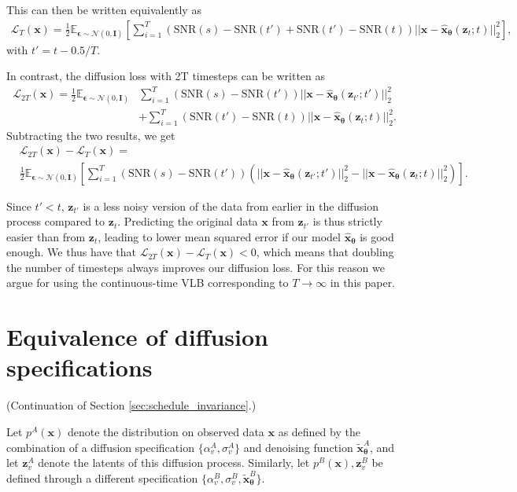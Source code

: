 \documentclass{article}
\def\rvx{{\mathbf{x}}}
\def\rvz{{\mathbf{z}}}
\newcommand{\E}{\mathbb{E}}
\newcommand{\bT}{{\boldsymbol{\theta}}}
\newcommand{\bfI}{\mathbf{I}}
\newcommand{\bepsilon}{{\boldsymbol{\epsilon}}}
\newcommand{\lT}{\mathcal{L}_T(\rvx)}
\newcommand{\ldT}{\mathcal{L}_{2T}(\rvx)}
\newcommand{\snr}{\text{SNR}}
\begin{document}
This can then be written equivalently as
\begin{align}
\lT =
\frac{1}{2}\E_{\bepsilon \sim \mathcal{N}(0,\bfI)}
\left[\sum_{i=1}^T
\left(\snr(s)-\snr(t') + \snr(t')-\snr(t)\right)
||\rvx - \hat{\rvx}_{\bT}(\rvz_{t};t) ||_2^2 \right],
\end{align}
with $t' = t - 0.5/T$.

In contrast, the diffusion loss with 2T timesteps can be written as
\begin{align}
\ldT =
\frac{1}{2}\E_{\bepsilon \sim \mathcal{N}(0,\bfI)}
& \sum_{i=1}^T
\left(\snr(s)-\snr(t')\right)
||\rvx - \hat{\rvx}_{\bT}(\rvz_{t'};t') ||_2^2 \nonumber\\
&+ \sum_{i=1}^T
\left(\snr(t')-\snr(t)\right)
||\rvx - \hat{\rvx}_{\bT}(\rvz_{t};t) ||_2^2.
\end{align}
Subtracting the two results, we get
\begin{align}
&\ldT - \lT = \nonumber\\ &\frac{1}{2}\E_{\bepsilon \sim \mathcal{N}(0,\bfI)}
\left[\sum_{i=1}^T (\snr(s)-\snr(t')) \left(
||\rvx - \hat{\rvx}_{\bT}(\rvz_{t'};t') ||_2^2 - ||\rvx - \hat{\rvx}_{\bT}(\rvz_{t};t) ||_2^2 \right)\right].
\end{align}

Since $t' < t$, $\rvz_{t'}$ is a less noisy version of the data from earlier in the diffusion process compared to $\rvz_{t}$. Predicting the original data $\rvx$ from $\rvz_{t'}$ is thus strictly easier than from $\rvz_{t}$, leading to lower mean squared error if our model $\hat{\mathbf{x}}_{\bT}$ is good enough. We thus have that $\ldT - \lT < 0$, which means that doubling the number of timesteps always improves our diffusion loss. For this reason we argue for using the continuous-time VLB corresponding to $T\rightarrow\infty$ in this paper.

\section{Equivalence of diffusion specifications}
\label{sec:app_equivalence}
(Continuation of Section \ref{sec:schedule_invariance}.)

Let $p^{A}(\rvx)$ denote the distribution on observed data $\rvx$ as defined by the combination of a diffusion specification $\{\alpha^A_v, \sigma^A_v\}$ and denoising function $\tilde{\rvx}^A_{\bT}$, and let $\rvz^{A}_v$ denote the latents of this diffusion process. Similarly, let $p^{B}(\rvx), \rvz^{B}_v$ be defined through a different specification $\{\alpha^B_v, \sigma^B_v, \tilde{\rvx}^B_{\bT}\}$.
\end{document}

